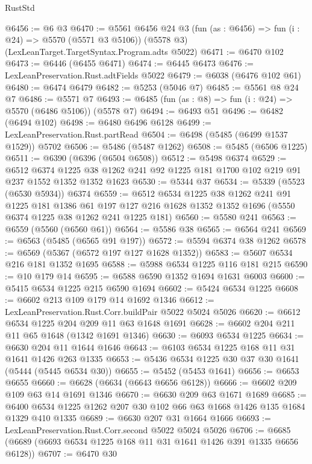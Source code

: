 \begin{lexlean}{RustStd}
\begin{coremodule}
@6456 := @6 @3
@6470 := @5561
    @6456
    @24
    @3
    (fun (as : @6456) => fun (i : @24) => @5570 (@5571 @3 @5106))
    (@5578 @3)
    (LexLeanTarget.TargetSyntax.Program.adts @5022)
@6471 := @6470 @102
@6473 := @6446 (@6455 @6471)
@6474 := @6445 @6473
@6476 := LexLeanPreservation.Rust.adtFields @5022
@6479 := @6038 (@6476 @102 @61)
@6480 := @6474 @6479
@6482 := @5253 (@5046 @7)
@6485 := @5561 @8 @24 @7
@6486 := @5571 @7
@6493 := @6485 (fun (as : @8) => fun (i : @24) => @5570 (@6486 @5106)) (@5578 @7)
@6494 := @6493 @51
@6496 := @6482 (@6494 @102)
@6498 := @6480 @6496 @6128
@6499 := LexLeanPreservation.Rust.partRead
@6504 := @6498 (@5485 (@6499 @1537 @1529)) @5702
@6506 := @5486 (@5487 @1262)
@6508 := @5485 (@6506 @1225)
@6511 := @6390 (@6396 (@6504 @6508))
@6512 := @5498 @6374
@6529 := @6512
    @6374
    @1225
    @38
    @1262
    @241
    @92
    @1225
    @181
    @1700
    @102
    @219
    @91
    @237
    @1552
    @1352
    @1352
    @1623
@6530 := @5344 @37
@6534 := @5339 (@5523 (@6530 @5934)) @6374
@6559 := @6512
    @6534
    @1225
    @38
    @1262
    @241
    @91
    @1225
    @181
    @1386
    @61
    @197
    @127
    @216
    @1628
    @1352
    @1352
    @1696
    (@5550 @6374 @1225 @38 @1262 @241 @1225 @181)
@6560 := @5580 @241
@6563 := @6559 (@5560 (@6560 @61))
@6564 := @5586 @38
@6565 := @6564 @241
@6569 := @6563 (@5485 (@6565 @91 @197))
@6572 := @5594 @6374 @38 @1262
@6578 := @6569 (@5367 (@6572 @197 @127 @1628 @1352))
@6583 := @5607 @6534 @216 @181 @1352 @1695
@6588 := @5988 @6534 @1225 @116 @181 @215
@6590 := @10 @179 @14
@6595 := @6588 @6590 @1352 @1694 @1631 @6003
@6600 := @5415 @6534 @1225 @215 @6590 @1694
@6602 := @5424 @6534 @1225
@6608 := @6602 @213 @109 @179 @14 @1692 @1346
@6612 := LexLeanPreservation.Rust.Corr.buildPair @5022 @5024 @5026
@6620 := @6612 @6534 @1225 @204 @209 @11 @63 @1648 @1691
@6628 := @6602 @204 @211 @11 @65 @1648 (@1342 @1691 @1346)
@6630 := @6093 @6534 @1225
@6634 := @6630 @204 @11 @1644 @1646
@6643 := @6103 @6534 @1225 @168 @11 @31 @1641 @1426 @263 @1335
@6653 := @5436 @6534 @1225 @30 @37 @30 @1641 (@5444 (@5445 @6534 @30))
@6655 := @5452 (@5453 @1641)
@6656 := @6653 @6655
@6660 := @6628 (@6634 (@6643 @6656 @6128))
@6666 := @6602 @209 @109 @63 @14 @1691 @1346
@6670 := @6630 @209 @63 @1671 @1689
@6685 := @6400 @6534 @1225 @1262 @207 @30 @102 @66 @63 @1668 @1426 @135 @1684 @1329 @410 @1335
@6689 := @6630 @207 @31 @1664 @1666
@6693 := LexLeanPreservation.Rust.Corr.second @5022 @5024 @5026
@6706 := @6685 (@6689 (@6693 @6534 @1225 @168 @11 @31 @1641 @1426 @391 @1335 @6656 @6128))
@6707 := @6470 @30

\end{coremodule}
\end{lexlean}
